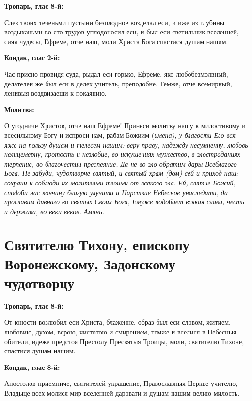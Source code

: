 \medskip


\bfseries Тропарь, глас 8-й:\normalfont{}


Слез твоих теченьми пустыни безплодное возделал еси, и иже из глубины воздыханьми во сто трудов уплодоносил еси, и был еси светильник вселенней, сияя чудесы, Ефреме, отче наш, моли Христа Бога спастися душам нашим.


\medskip


\bfseries Кондак, глас 2-й:\normalfont{}


Час присно провидя суда, рыдал еси горько, Ефреме, яко любобезмолвный, делателен же был еси в делех учитель, преподобне. Темже, отче всемирный, ленивыя воздвизаеши к покаянию.


\medskip


\bfseries Молитва:\normalfont{}


О угодниче Христов, отче наш Ефреме! Принеси молитву нашу к милостивому и всесильному Богу и испроси нам, рабам Божиим (\itshape имена\normalfont{}), у благости Его вся яже на пользу душам и телесем нашим: веру праву, надежду несумненну, любовь нелицемерну, кротость и незлобие, во искушениях мужество, в злостраданиях терпение, во благочестии преспеяние. Да не во зло обратим дары Всеблагого Бога. Не забуди, чудотворче святый, и святый храм (дом) сей и приход наш: сохрани и соблюди их молитвами твоими от всякого зла. Ей, святче Божий, сподоби нас кончину благую улучити и Царствие Небесное унаследити, да прославим дивнаго во святых Своих Бога, Емуже подобает всякая слава, честь и держава, во веки веков. Аминь.


\section{Святителю Тихону, епископу Воронежскому, Задонскому чудотворцу}
 


\bfseries Тропарь, глас 8-й:\normalfont{}


От юности возлюбил еси Христа, блаженне, образ был еси словом, житием, любовию, духом, верою, чистотою и смирением, темже и вселися в Небесныя обители, идеже предстоя Престолу Пресвятыя Троицы, моли, святителю Тихоне, спастися душам нашим.


\medskip


\bfseries Кондак, глас 8-й:\normalfont{}


Апостолов приемниче, святителей украшение, Православныя Церкве учителю, Владыце всех молися мир вселенней даровати и душам нашим велию милость.


